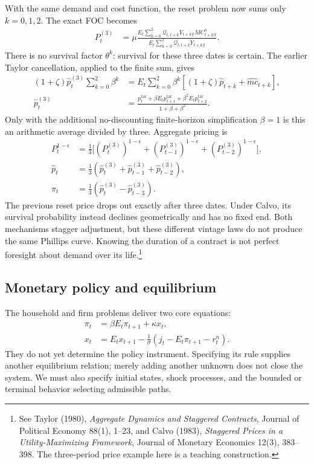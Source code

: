 With the same demand and cost function, the reset problem now sums only
$k=0,1,2$. The exact FOC becomes
\begin{align}
 P_t^{(3)}&=\mu\frac{E_t\sum_{k=0}^{2}\mathcal Q_{t,t+k}
                               Y_{t+k|t}MC_{t+k|t}^n}
                         {E_t\sum_{k=0}^{2}\mathcal Q_{t,t+k}Y_{t+k|t}}.
\end{align}
There is no survival factor $\theta^k$: survival for these three dates is certain.
The earlier Taylor cancellation, applied to the finite sum, gives
\begin{align}
 (1+\zeta)\hat p_t^{(3)}\sum_{k=0}^2\beta^k
 &=E_t\sum_{k=0}^2\beta^k
                  [(1+\zeta)\hat p_{t+k}+\hat{mc}_{t+k}],\\
 \hat p_t^{(3)}
 &=\frac{p_t^{\mathrm{tar}}+\beta E_tp_{t+1}^{\mathrm{tar}}
                        +\beta^2E_tp_{t+2}^{\mathrm{tar}}}{1+\beta+\beta^2}.
\end{align}
Only with the additional no-discounting finite-horizon simplification $\beta=1$
is this an arithmetic average divided by three. Aggregate pricing is
\begin{align}
 P_t^{1-\epsilon}
 &=\frac13\big[(P_t^{(3)})^{1-\epsilon}
              +(P_{t-1}^{(3)})^{1-\epsilon}+(P_{t-2}^{(3)})^{1-\epsilon}\big],\\
 \hat p_t&=\frac13(\hat p_t^{(3)}+\hat p_{t-1}^{(3)}+\hat p_{t-2}^{(3)}),\\
 \pi_t&=\frac13(\hat p_t^{(3)}-\hat p_{t-3}^{(3)}).
\end{align}
The previous reset price drops out exactly after three dates. Under Calvo,
its survival probability instead declines geometrically and has no fixed end.
Both mechanisms stagger adjustment, but these different vintage laws do not
produce the same Phillips curve. Knowing the duration of a contract is not
perfect foresight about demand over its life.\footnote{See Taylor (1980),
\textit{Aggregate Dynamics and Staggered Contracts}, Journal of Political
Economy 88(1), 1--23, and Calvo (1983), \textit{Staggered Prices in a
Utility-Maximizing Framework}, Journal of Monetary Economics 12(3), 383--398.
The three-period price example here is a teaching construction.}

\subsection{Monetary policy and equilibrium}

The household and firm problems deliver two core equations:
\begin{align}
 \pi_t&=\beta E_t\pi_{t+1}+\kappa x_t,\\
 x_t&=E_tx_{t+1}-\frac1\sigma(j_t-E_t\pi_{t+1}-r_t^n).
\end{align}
They do not yet determine the policy instrument. Specifying its rule supplies
another equilibrium relation; merely adding another unknown does not close
the system. We must also specify initial states, shock processes, and the
bounded or terminal behavior selecting admissible paths.

